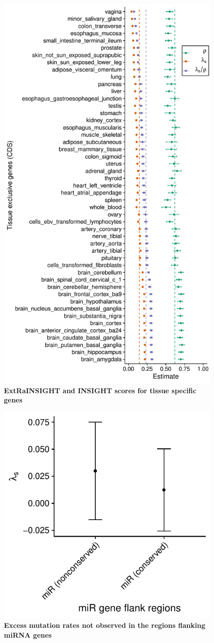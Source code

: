 \documentclass{article}
\begin{document}
\begin{figure}
    \centering
    \includegraphics[width = 0.65\linewidth]{supplemental_figures/tissue_specificity_cds_ratio.pdf}
    \caption{\textbf{ExtRaINSIGHT and INSIGHT scores for tissue specific genes}}
    \label{fig:tissue_specific_scores}
\end{figure}

\begin{figure}
    \centering
    \includegraphics[width = 0.6\linewidth]{supplemental_figures/miRNA_flank_constraint.pdf}
    \caption{\textbf{Excess mutation rates not observed in the regions flanking miRNA genes}}
    \label{fig:miRNA_flank}
\end{figure}
\end{document}
